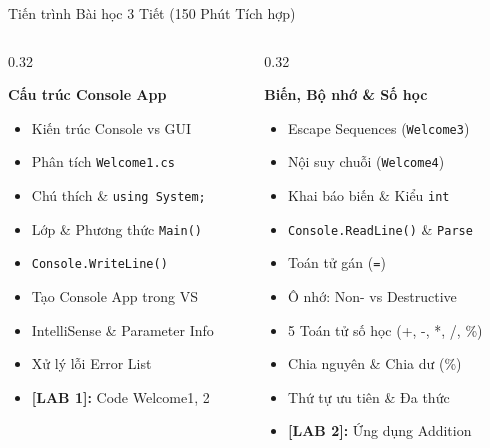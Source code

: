 \documentclass[aspectratio=169, 10pt]{beamer}
\begin{document}
\begin{frame}{Tiến trình Bài học 3 Tiết (150 Phút Tích hợp)}
  \begin{columns}[T]
    \begin{column}{0.32\textwidth}
      \begin{tcolorbox}[colback=UniNavy!5,colframe=UniNavy,title=\textbf{TIẾT 1 (50')},fonttitle=\small\bfseries]
        \textbf{Cấu trúc Console App}
        \begin{itemize}\scriptsize
          \item Kiến trúc Console vs GUI
          \item Phân tích \texttt{Welcome1.cs}
          \item Chú thích \& \texttt{using System;}
          \item Lớp \& Phương thức \texttt{Main()}
          \item \texttt{Console.WriteLine()}
          \item Tạo Console App trong VS
          \item IntelliSense \& Parameter Info
          \item Xử lý lỗi Error List
          \item \textbf{[LAB 1]:} Code Welcome1, 2
        \end{itemize}
      \end{tcolorbox}
    \end{column}

    \begin{column}{0.32\textwidth}
      \begin{tcolorbox}[colback=CSharpPurple!5,colframe=CSharpPurple,title=\textbf{TIẾT 2 (50')},fonttitle=\small\bfseries]
        \textbf{Biến, Bộ nhớ \& Số học}
        \begin{itemize}\scriptsize
          \item Escape Sequences (\texttt{Welcome3})
          \item Nội suy chuỗi (\texttt{Welcome4})
          \item Khai báo biến \& Kiểu \texttt{int}
          \item \texttt{Console.ReadLine()} \& \texttt{Parse}
          \item Toán tử gán (\texttt{=})
          \item Ô nhớ: Non- vs Destructive
          \item 5 Toán tử số học (+, -, *, /, \%)
          \item Chia nguyên \& Chia dư (\%)
          \item Thứ tự ưu tiên \& Đa thức
          \item \textbf{[LAB 2]:} Ứng dụng Addition
        \end{itemize}
      \end{tcolorbox}
    \end{column}


\end{columns}
\end{frame}
\end{document}
